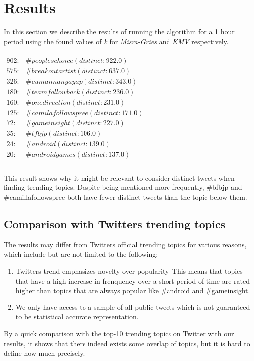 \section{Results}\label{results}
In this section we describe the results of running the algorithm for a 1 hour period using the found values of \textit{k} for \textit{Misra-Gries} and \textit{KMV} respectively.
\\\\
$\begin{array}{ll}
    902: & \#peopleschoice (distinct: 922.0) \\
    575: & \#breakoutartist (distinct: 637.0) \\
    326: & \#cumannanyayap (distinct: 343.0) \\
    180: & \#teamfollowback (distinct: 236.0) \\
    160: & \#onedirection (distinct: 231.0) \\
    125: & \#camilafollowspree (distinct: 171.0) \\
    72: & \#gameinsight (distinct: 227.0) \\
    35: & \#tfbjp (distinct: 106.0) \\
    24: & \#android (distinct: 139.0) \\
    20: & \#androidgames (distinct: 137.0) \\
\end{array}$
\\\\
This result shows why it might be relevant to consider distinct tweets when finding trending topics. Despite being mentioned more frequently, \#bfbjp and \#camillafollowspree both have fewer distinct tweets than the topic below them.

\subsection{Comparison with Twitters trending topics}\label{twitter-result}
The results may differ from Twitters official trending topics for various reasons, which include but are not limited to the following: 
\\
\begin{enumerate}
	\item Twitters trend emphasizes novelty over popularity. This means that topics that have a high increase in frenquency over a short period of time are rated higher than topics that are always popular like \#android and \#gameinsight. 
	\item We only have access to a sample of all public tweets which is not guaranteed to be statistical accurate representation.
\end{enumerate}

By a quick comparison with the top-10 trending topics on Twitter with our results, it shows that there indeed exists some overlap of topics, but it is hard to define how much precisely.


